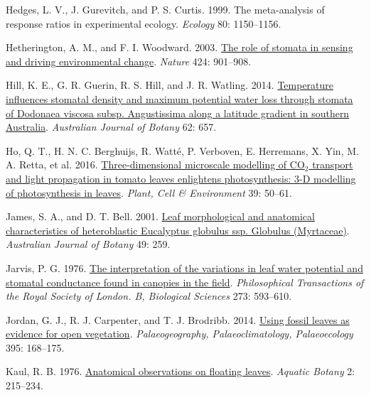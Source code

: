 \documentclass[
  letterpaper,
  DIV=11,
  numbers=noendperiod]{scrartcl}
\newlength{\cslhangindent}
\newlength{\cslentryspacingunit} %
\newenvironment{CSLReferences}[2] %
 {%
  \setlength{\parindent}{0pt}
  \ifodd #1
  \let\oldpar\par
  \def\par{\hangindent=\cslhangindent\oldpar}
  \fi
  \setlength{\parskip}{#2\cslentryspacingunit}
 }%
 {}
\begin{document}
\begin{CSLReferences}{1}{0}
\leavevmode{}%
Hedges, L. V., J. Gurevitch, and P. S. Curtis. 1999. The meta-analysis
of response ratios in experimental ecology. \emph{Ecology} 80:
1150--1156.

\leavevmode{}%
Hetherington, A. M., and F. I. Woodward. 2003.
\href{https://doi.org/10.1038/nature01843}{The role of stomata in
sensing and driving environmental change}. \emph{Nature} 424: 901--908.

\leavevmode{}%
Hill, K. E., G. R. Guerin, R. S. Hill, and J. R. Watling. 2014.
\href{https://doi.org/10.1071/BT14204}{Temperature influences stomatal
density and maximum potential water loss through stomata of {Dodonaea}
viscosa subsp. Angustissima along a latitude gradient in southern
{Australia}}. \emph{Australian Journal of Botany} 62: 657.

\leavevmode{}%
Ho, Q. T., H. N. C. Berghuijs, R. Watté, P. Verboven, E. Herremans, X.
Yin, M. A. Retta, et al. 2016.
\href{https://doi.org/10.1111/pce.12590}{Three-dimensional microscale
modelling of {CO}\(_{\textrm{2}}\) transport and light propagation in
tomato leaves enlightens photosynthesis: 3-{D} modelling of
photosynthesis in leaves}. \emph{Plant, Cell \& Environment} 39: 50--61.

\leavevmode{}%
James, S. A., and D. T. Bell. 2001.
\href{https://doi.org/10.1071/BT99044}{Leaf morphological and anatomical
characteristics of heteroblastic {Eucalyptus} globulus ssp. Globulus
({Myrtaceae})}. \emph{Australian Journal of Botany} 49: 259.

\leavevmode{}%
Jarvis, P. G. 1976. \href{https://doi.org/10.1098/rstb.1976.0035}{The
interpretation of the variations in leaf water potential and stomatal
conductance found in canopies in the field}. \emph{Philosophical
Transactions of the Royal Society of London. B, Biological Sciences}
273: 593--610.

\leavevmode{}%
Jordan, G. J., R. J. Carpenter, and T. J. Brodribb. 2014.
\href{https://doi.org/10.1016/j.palaeo.2013.12.035}{Using fossil leaves
as evidence for open vegetation}. \emph{Palaeogeography,
Palaeoclimatology, Palaeoecology} 395: 168--175.

\leavevmode{}%
Kaul, R. B. 1976.
\href{https://doi.org/10.1016/0304-3770(76)90022-X}{Anatomical
observations on floating leaves}. \emph{Aquatic Botany} 2: 215--234.


\end{CSLReferences}
\end{document}

